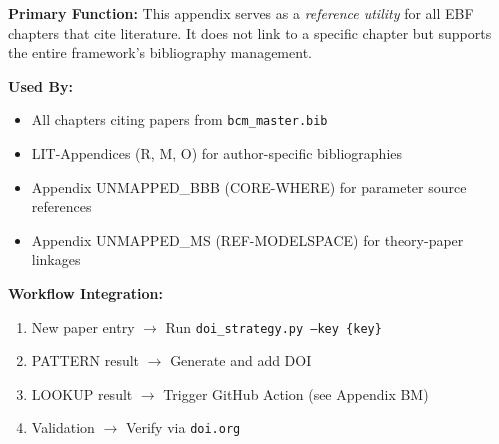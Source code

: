 \begin{tcolorbox}[colback=blue!5, colframe=blue!50, title=Chapter Linkage]
\small
\textbf{Primary Function:} This appendix serves as a \emph{reference utility} for all EBF chapters that cite literature. It does not link to a specific chapter but supports the entire framework's bibliography management.

\textbf{Used By:}
\begin{itemize}[noitemsep]
    \item All chapters citing papers from \texttt{bcm\_master.bib}
    \item LIT-Appendices (R, M, O) for author-specific bibliographies
    \item Appendix UNMAPPED_BBB (CORE-WHERE) for parameter source references
    \item Appendix UNMAPPED_MS (REF-MODELSPACE) for theory-paper linkages
\end{itemize}

\textbf{Workflow Integration:}
\begin{enumerate}[noitemsep]
    \item New paper entry $\to$ Run \texttt{doi\_strategy.py --key \{key\}}
    \item PATTERN result $\to$ Generate and add DOI
    \item LOOKUP result $\to$ Trigger GitHub Action (see Appendix BM)
    \item Validation $\to$ Verify via \texttt{doi.org}
\end{enumerate}
\end{tcolorbox}

